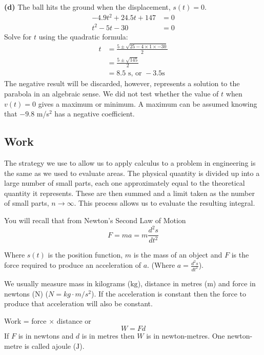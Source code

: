 \begin{multicols}{2}
\textbf{(d)} The ball hits the ground when the displacement, $s(t) =0$.
\begin{align*}-4.9 t^{2} +24.5 t +147 &  = 0 \\
t^{2} -5 t -30 &  = 0\end{align*}
Solve for $t$ using the quadratic formula: 
\begin{align*}t &  = \frac{5 \pm \sqrt{25 -4 \times 1 \times  -30}}{2} \\
 &  = \frac{5 \pm \sqrt{145}}{2} \\
 &  =8.5\text{ s, or }-3.5\text{s}\end{align*}
The negative result will be discarded, however, represents a solution to the parabola in an algebraic sense. We did not test whether the value of $t$ when $v (t) =0$ gives a maximum or minimum. A maximum can be assumed knowing that $-9.8$ m/s$^2$ has a negative coefficient. 
\end{multicols}

\subsection*{Work}
The strategy we use to allow us to apply calculus to a problem in engineering is the same as we used to evaluate areas. The
physical quantity is divided up into a large number of small parts, each one approximately equal to the theoretical quantity it represents. These
are then summed and a limit taken as the number of small parts, $n \rightarrow \infty $. This process allows us to evaluate the resulting integral. 

You
will recall that from Newton's Second Law of Motion
\begin{equation}F =m a =m \frac{d^{2} s}{d t^{2}}\tag{1}
\end{equation}

Where $s (t)$ is the position function, $m$ is the mass of an object and $F$ is the force required to produce an acceleration of $a$. (Where $a =\frac{d^{2} s}{d t^{2}}$). 

We usually measure mass in kilograms ($\mbox{kg}$), distance in metres ($\mbox{m}$) and force in newtons ($\mbox{N}$) \linebreak\relax ($N =k g \cdot m/s^{2}$). If the acceleration is constant then the force to produce that acceleration will also
be constant. 

Work = force $ \times $ distance or
\begin{equation}W =F d\tag{2}
\end{equation}If $F$ is in newtons and $d$ is in metres then $W$ is in newton-metres. One newton-metre is called a\linebreak\relax joule ($\mbox{J}$).

